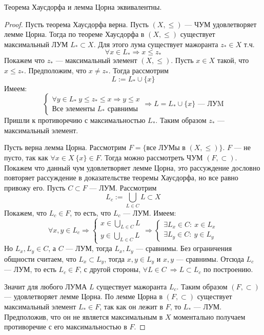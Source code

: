 \begin{claim}
	Теорема Хаусдорфа и лемма Цорна эквивалентны.
\end{claim}
\begin{proof}
Пусть теорема Хаусдорфа верна. Пусть $(X, \leq)$ --- ЧУМ удовлетворяет лемме Цорна. Тогда по теореме Хаусдорфа в $(X,\leq)$ существует максимальный ЛУМ  $L_* \subset X$. Для этого лума существует мажоранта $z_* \in X$ т.ч. 
		$$
		\forall x \in L_* \Rightarrow x \leq z_*
		$$
		Покажем что $z_*$ --- максимальный элемент $(X, \leq)$. Пусть $x \in X$ такой, что $x \leq z_*$. Предположим, что $ x \neq z_*$. Тогда рассмотрим 
		$$
		L := L_*\cup \{x\}
		$$
		Имеем:
		$$
		\begin{cases}
			\forall y \in L_*\ y \leq z_* \leq x \Rightarrow y \leq x \\
			\text{Все элементы } L_* \text{ сравнимы}	
		\end{cases} 
		\Rightarrow L = L_*\cup \{x\} \text{ --- ЛУM}
		$$
		Пришли к противоречию с максимальностью $L_*$. Таким образом $z_*$ --- максимальный элемент.
		
		 Пусть верна лемма Цорна. Рассмотрим $F = \{\text{все ЛУМы в } (X, \leq)\}$. $F$ --- не пусто, так как $\forall x \in X \ \{x\} \in F$. Тогда можно рассмотреть ЧУМ $(F, \subset)$. Покажем что данный чум удовлетворяет лемме Цорна, это рассуждение дословно повторяет рассуждение в доказательстве теоремы Хаусдорфа, но все равно привожу его. Пусть $C \subset F$ --- ЛУМ. Рассмотрим 
		$$
		L_c := \bigcup\limits_{L \in C}L \subset X
		$$
		Покажем, что $L_c \in F$, то есть, что $L_c$ --- ЛУМ. Имеем:
		$$
		\forall x,y \in L_c \Rightarrow 
		\begin{cases}
			x \in \bigcup\limits_{L \in C} L \\
			y \in \bigcup\limits_{L \in C} L 
		\end{cases} 
		\Rightarrow 
		\begin{cases}
			\exists L_x \in C:\ x \in L_x \\
			\exists L_y \in C:\ y \in L_y 
		\end{cases}
		$$
		Но $L_x, L_y \in C$, а $C$ --- ЛУМ, тогда $L_x, L_y$ --- сравнимы. Без ограничения общности считаем, что $L_x \subset L_y$, тогда $x, y \in L_y$ и $x,y$ --- сравнимы. Отсюда $L_c$ --- ЛУМ, то есть $L_c \in F$, с другой стороны, $\forall L \in C \ \Rightarrow L \subset L_c$ по построению. 
		
		Значит для любого ЛУМА $L$ существует мажоранта $L_c$. Таким образом $(F, \subset)$ --- удовлетворяет лемме Цорна. По лемме Цорна в $(F, \subset)$ существует максимальный элемент $L_* \in F$, так как он лежит в $F$, то $L_*$ --- ЛУМ. Предположив, что он не является максимальным в $X$ моментально получаем противоречие с его максимальностью в $F$. 
\end{proof}

